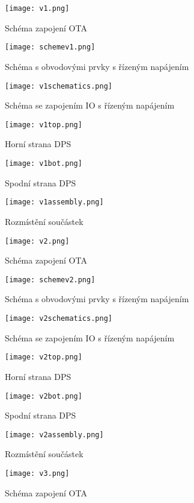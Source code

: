 \begin{figure}[h]
\centering
\texttt{[image: v1.png]}
\caption[]{Schéma zapojení OTA \label{s:V1}}
\end{figure}
\begin{figure}[h]
\centering
\texttt{[image: schemev1.png]}
\caption[]{Schéma s obvodovými prvky s řízeným napájením}
\end{figure}
\begin{figure}[h]
\centering
\texttt{[image: v1schematics.png]}
\caption[]{Schéma se zapojením IO s řízeným napájením}
\end{figure}
\begin{figure}[h]
\centering
\texttt{[image: v1top.png]}
\caption[]{Horní strana DPS}
\end{figure}
\begin{figure}[h]
\centering
\texttt{[image: v1bot.png]}
\caption[]{Spodní strana DPS}
\end{figure}
\begin{figure}[h]
\centering
\texttt{[image: v1assembly.png]}
\caption[]{Rozmístění součástek}
\end{figure}
\begin{figure}[h]
\centering
\texttt{[image: v2.png]}
\caption[]{Schéma zapojení OTA}
\end{figure}
\begin{figure}[h]
\centering
\texttt{[image: schemev2.png]}
\caption[]{Schéma s obvodovými prvky s řízeným napájením}
\end{figure}
\begin{figure}[h]
\centering
\texttt{[image: v2schematics.png]}
\caption[]{Schéma se zapojením IO s řízeným napájením}
\end{figure}
\begin{figure}[h]
\centering
\texttt{[image: v2top.png]}
\caption[]{Horní strana DPS}
\end{figure}
\begin{figure}[h]
\centering
\texttt{[image: v2bot.png]}
\caption[]{Spodní strana DPS}
\end{figure}
\begin{figure}[h]
\centering
\texttt{[image: v2assembly.png]}
\caption[]{Rozmístění součástek}
\end{figure}
\begin{figure}[h]
\centering
\texttt{[image: v3.png]}
\caption[]{Schéma zapojení OTA}
\end{figure}
